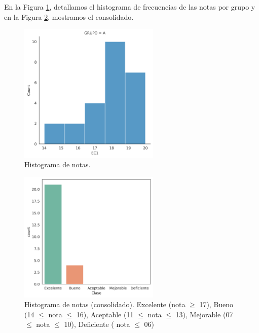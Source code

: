     \begin{flushleft}
    En la Figura \ref{fig:hist_EC1}, detallamos el histograma de frecuencias de las
    notas por grupo y en la Figura \ref{fig:hist_all_EC1}, mostramos el consolidado. 
    \end{flushleft}

    \begin{figure}[H]	
    \centering 		
				\includegraphics[width=0.6\textwidth]{../imgs/hist_EC1.png}
                \caption{Histograma de notas.}
                \label{fig:hist_EC1}
	\end{figure}

    \begin{figure}[H]	
    \centering 		
				\includegraphics[width=0.6\textwidth]{../imgs/hist_all_EC1.png}
                \caption{Histograma de notas (consolidado). Excelente (nota $\geq$ 17), Bueno (14 $\leq$ nota $\leq$ 16), Aceptable (11 $\leq$ nota $\leq$ 13), Mejorable (07 $\leq$ nota $\leq$ 10), Deficiente ( nota $\leq$ 06)}
                \label{fig:hist_all_EC1}
	\end{figure}
      

